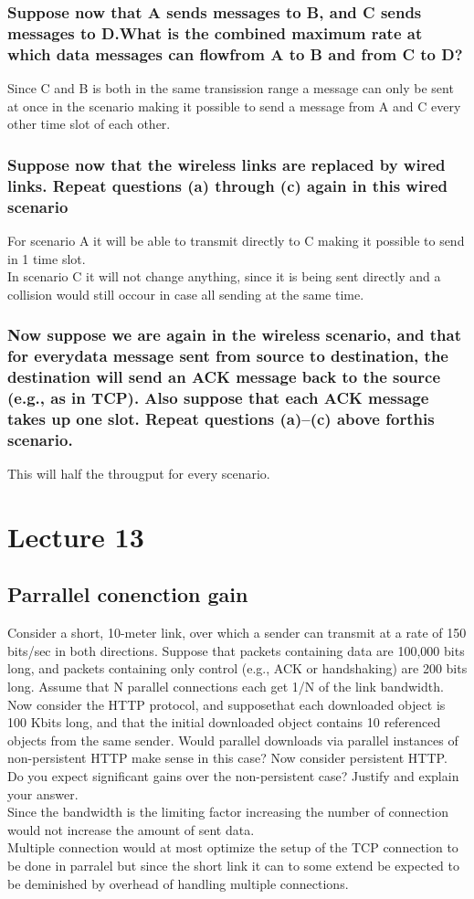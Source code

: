 \documentclass[12pt, a4paper]{article}
\begin{document}
			\subsubsection{Suppose now that A sends messages to B, and C sends messages to D.What is the combined maximum rate at which data messages can flowfrom A to B and from C to D?}
				Since C and B is both in the same transission range a message can only be sent at once in the scenario making it possible to send a message from A and C every other time slot of each other.
			\subsubsection{Suppose now that the wireless links are replaced by wired links. Repeat questions (a) through (c) again in this wired scenario}
				For scenario A it will be able to transmit directly to C making it possible to send in 1 time slot.\\
				In scenario C it will not change anything, since it is being sent directly and a collision would still occour in case all sending at the same time.
			\subsubsection{Now suppose we are again in the wireless scenario, and that for everydata message sent from source to destination, the destination will send an ACK message back to the source (e.g., as in TCP). Also suppose that each ACK message takes up one slot. Repeat questions (a)–(c) above forthis scenario.}
				This will half the througput for every scenario.
	\section{Lecture 13}
		\subsection{Parrallel conenction gain}
			Consider a short, 10-meter link, over which a sender can transmit at a rate of 150 bits/sec in both directions. Suppose that packets containing data are 100,000 bits long, and packets containing only control (e.g., ACK or handshaking) are 200 bits long. Assume that N parallel connections each get 1/N of the link bandwidth. Now consider the HTTP protocol, and supposethat each downloaded object is 100 Kbits long, and that the initial downloaded object contains 10 referenced objects from the same sender. Would parallel downloads via parallel instances of non-persistent HTTP make sense in this case? Now consider persistent HTTP. Do you expect significant gains over the non-persistent case? Justify and explain your answer.\\
			Since the bandwidth is the limiting factor increasing the number of connection would not increase the amount of sent data.\\
			Multiple connection would at most optimize the setup of the TCP connection to be done in parralel but since the short link it can to some extend be expected to be deminished by overhead of handling multiple connections.
\end{document}

